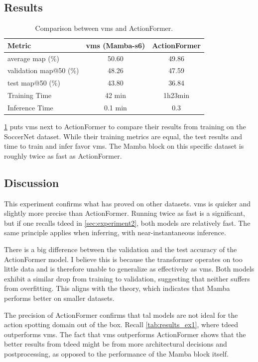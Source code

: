 \subsection{Results}

\begin{table}[ht]
    \centering
    \begin{tabular}{lcc}
        \toprule
        Metric & \acrshort{vms} (Mamba-\acrshort{s6}) & ActionFormer \\
        \midrule
        average \acrshort{map} (\%) & 50.60 & 49.86 \\
        validation \acrshort{map}@50 (\%) & 48.26 & 47.59 \\
        test \acrshort{map}@50 (\%) & 43.80 & 36.84 \\
        Training Time & 42 min & 1h23min \\
        Inference Time & 0.1 min & 0.3 \\
        \bottomrule
    \end{tabular}
    \caption{Comparison between \acrshort{vms} and ActionFormer.}
    \label{tab:results_ex7}
\end{table}

\cref{tab:results_ex7} puts \acrshort{vms} next to ActionFormer to compare their results from training on the SoccerNet dataset. While their training metrics are equal, the test results and time to train and infer favor \acrshort{vms}. The Mamba block on this specific dataset is roughly twice as fast as ActionFormer.


\subsection{Discussion}

This experiment confirms what \textcite{li_videomamba_2024} has proved on other datasets. \acrshort{vms} is quicker and slightly more precise than ActionFormer. Running twice as fast is a significant, but if one recalls \acrshort{tdeed} in \cref{sec:experiment2}, both models are relatively fast. The same principle applies when inferring, with near-instantaneous inference. 

There is a big difference between the validation and the test accuracy of the ActionFormer model. I believe this is because the transformer operates on too little data and is therefore unable to generalize as effectively as \acrshort{vms}. Both models exhibit a similar drop from training to validation, suggesting that neither suffers from overfitting. This aligns with the theory, which indicates that Mamba performs better on smaller datasets. 

The precision of ActionFormer confirms that \acrfull{tal} models are not ideal for the action spotting domain out of the box. Recall \cref{tab:results_ex1}, where \acrshort{tdeed} outperforms \acrshort{vms}. The fact that \acrshort{vms} outperforms ActionFormer shows that the better results from \acrshort{tdeed} might be from more architectural decisions and postprocessing, as opposed to the performance of the Mamba block itself. 
